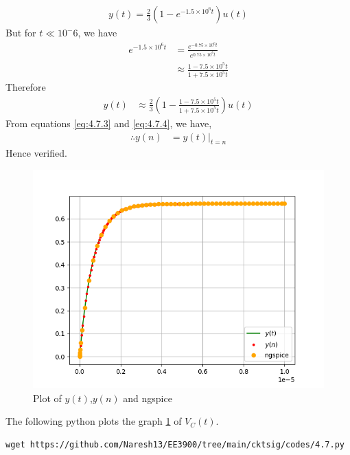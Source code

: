 \documentclass[journal,12pt,twocolumn]{IEEEtran}
\providecommand{\brak}[1]{\ensuremath{\left(#1\right)}}
\numberwithin{equation}{section}
\renewcommand\thesection{\arabic{section}}
\begin{document}
\begin{enumerate}[label=\thesection.\arabic*.,ref=\thesection.\theenumi]
\begin{align}
	y(t) = \frac{2}{3}\brak{1 - e^{-1.5\times10^6t}}u(t)
\end{align}
But for $t \ll 10^-6$, we have
\begin{align}
	e^{-1.5\times 10^6 t} &= \frac{e^{-0.75 \times 10^6 t}}{e^{0.75 \times 10^6 t}} \\
	&\approx \frac{1-7.5\times10^5t}{1+7.5\times10^5t}  
\end{align}
Therefore
\begin{align}
	\label{eq:4.7.4}
	y(t) &\approx \frac{2}{3} \brak{1 - \frac{1-7.5\times10^5t}{1+7.5\times10^5t}} u(t) 
\end{align}
From equations \eqref{eq:4.7.3} and \eqref{eq:4.7.4}, we have,
\begin{align}
	\therefore y(n) &= y(t)|_{t=n}
\end{align}
Hence verified.
\begin{figure}[!ht]
	\centering
	\includegraphics[width=\columnwidth]{./figs/4.7.png}
	\caption{Plot of $y(t)$,$y(n)$ and ngspice}
	\label{fig:4.7}	
\end{figure}
The following python plots the graph \ref{fig:4.7} of $V_C(t)$.
\begin{lstlisting}
wget https://github.com/Naresh13/EE3900/tree/main/cktsig/codes/4.7.py
\end{lstlisting}

\end{enumerate}
\end{document}
